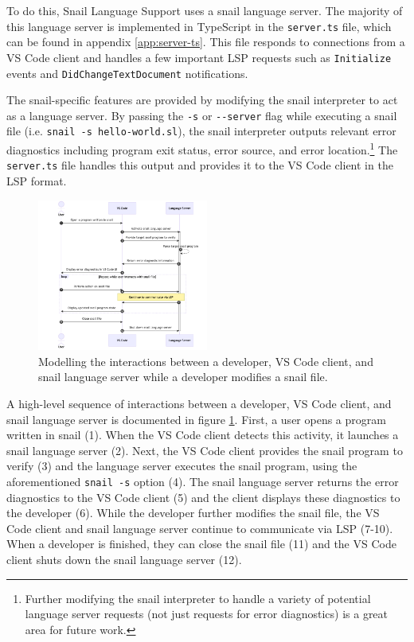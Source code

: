\documentclass{article}
\begin{document}
To do this, Snail Language Support uses a snail language server. The majority of this language server is implemented in TypeScript in the \lstinline{server.ts} file, which can be found in appendix \ref{app:server-ts}. This file responds to connections from a VS Code client and handles a few important LSP requests such as \lstinline{Initialize} events and \lstinline{DidChangeTextDocument} notifications.

The snail-specific features are provided by modifying the snail interpreter to act as a language server. By passing the \lstinline{-s} or \lstinline{--server} flag while executing a snail file (i.e. \lstinline{snail -s hello-world.sl}), the snail interpreter outputs relevant error diagnostics including program exit status, error source, and error location.\footnote{Further modifying the snail interpreter to handle a variety of potential language server requests (not just requests for error diagnostics) is a great area for future work.} The \lstinline{server.ts} file handles this output and provides it to the VS Code client in the LSP format.

\begin{figure}
    \includegraphics[width=0.5\textwidth]{png/lsp-sequence.png}
    \caption{
        \centering
            Modelling the interactions between a developer, VS Code client, and snail language server while a developer modifies a snail file.
    }
    \label{fig:lsp-sequence}
\end{figure}

A high-level sequence of interactions between a developer, VS Code client, and snail language server is documented in figure \ref{fig:lsp-sequence}. First, a user opens a program written in snail (1). When the VS Code client detects this activity, it launches a snail language server (2). Next, the VS Code client provides the snail program to verify (3) and the language server executes the snail program, using the aforementioned \lstinline{snail -s} option (4). The snail language server returns the error diagnostics to the VS Code client (5) and the client displays these diagnostics to the developer (6). While the developer further modifies the snail file, the VS Code client and snail language server continue to communicate via LSP (7-10). When a developer is finished, they can close the snail file (11) and the VS Code client shuts down the snail language server (12). 
\end{document}
